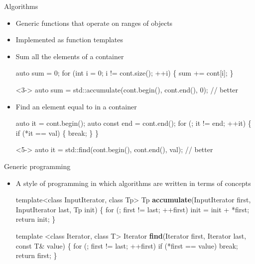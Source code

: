 \begin{frame}[fragile]{Algorithms}

  \begin{itemize}
  \item Generic functions that operate on \alert{ranges} of objects
  \item Implemented as function templates
  \end{itemize}

  \begin{itemize}
  \item<2-> Sum all the elements of a container 
    \begin{codeblock}
auto sum = 0;
for (int i = 0; i != cont.size(); ++i) \{
  sum += cont[i];
\}\end{codeblock}

    \begin{codeblock}<3->{
auto sum = std::accumulate(cont.begin(), cont.end(), 0); // better}\end{codeblock}

  \item<4-> Find an element equal to  in a container 
    \begin{codeblock}
auto it = cont.begin();
auto const end = cont.end();
for (; it != end; ++it) \{
  if (*it == val) \{
    break;
  \}
\}\end{codeblock}

    \begin{codeblock}<5->{
auto it = std::find(cont.begin(), cont.end(), val); // better}\end{codeblock}

  \end{itemize}
\end{frame}

\begin{frame}[fragile]{Generic programming}

  \begin{itemize}
  \item A style of programming in which \alert{algorithms} are written
    in terms of \alert{concepts}

    \begin{codeblock}
template<class InputIterator, class Tp>
Tp \textbf{accumulate}(InputIterator first, InputIterator last, Tp init)
\{
    for (; first \alert{!=} last; \alert{++}first)
        init \alert{=} init \alert{+} \alert{*}first;
    return init;
\}\end{codeblock}

  \begin{codeblock}
template <class Iterator, class T>
Iterator \textbf{find}(Iterator first, Iterator last, const T\& value)
\{
  for (; first \alert{!=} last; \alert{++}first)
    if (\alert{*}first \alert{==} value) break;
  return first;
\}\end{codeblock}

\end{itemize}
\end{frame}

